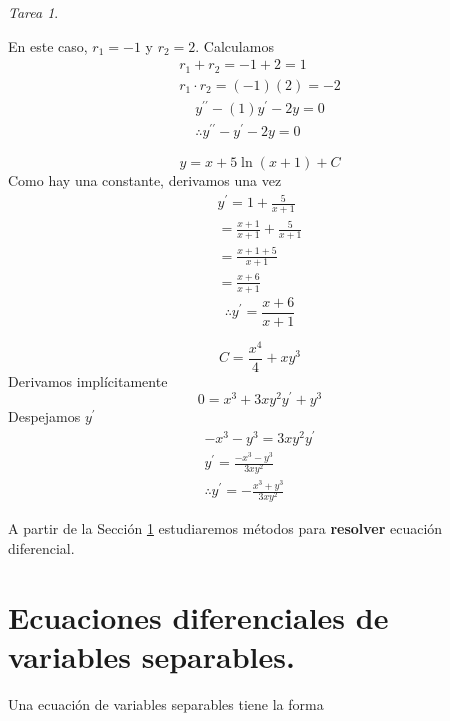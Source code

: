 \documentclass[12pt]{article} %
\theoremstyle{remark} %
\newtheorem{tarea}{Tarea}[section] %
\newcounter{ejercicio}[tarea]
\newcommand{\ed}{ecuación diferencial}
\begin{document}
\begin{tarea}
\begin{ejercicio}[4]
    En este caso, $r_1 = -1$ y $r_2 = 2$. Calculamos 
    \begin{gather*}
      r_1 + r_2 = -1 + 2 = 1\\
      r_1 \cdot r_2 = (-1)(2) = -2
    \end{gather*}
    \begin{gather*}
      y^{\prime \prime} -(1)y^{\prime} -2y = 0\\
      \therefore y^{\prime \prime} - y^{\prime} - 2y = 0
    \end{gather*}
  \end{ejercicio}
  \begin{ejercicio}[7]
    \[ y = x + 5 \ln(x+1) + C \]
    Como hay una constante, derivamos una vez
    \begin{gather*}
      y^{\prime} = 1 + \frac{5}{x+1}\\
      = \frac{x+1}{x+1} + \frac{5}{x+1}\\
      = \frac{x+1+5}{x+1}\\
      = \frac{x+6}{x+1}
    \end{gather*}
    \[ \therefore y^{\prime} = \frac{x+6}{x+1} \]
  \end{ejercicio}
  \begin{ejercicio}[9]
    \[ C = \frac{x^4}{4} + xy^{3} \]
    Derivamos implícitamente \[ 0 = x^3 + 3xy^2y^{\prime} + y^3 \]
    Despejamos $y^{\prime}$
    \begin{gather*}
      -x^3 - y^3 = 3xy^2y^{\prime}\\
      y^{\prime} = \frac{-x^3-y^3}{3xy^2}\\
      \therefore y^{\prime} = - \frac{x^3 + y^3}{3xy^2}
    \end{gather*}
  \end{ejercicio}
\end{tarea}
A partir de la Sección \ref{sec:variablesSeparables} estudiaremos métodos para \textbf{resolver} \ed .

\section{Ecuaciones diferenciales de variables separables.}
\label{sec:variablesSeparables}
Una ecuación de variables separables tiene la forma 
\end{document}
